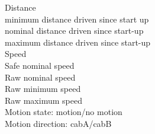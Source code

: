 \documentclass{template/openetcs_report}
\begin{document}
Distance\\
minimum distance driven since start up\\
nominal distance driven since start-up\\
maximum distance driven since start-up\\

Speed\\
Safe nominal speed\\
Raw nominal speed\\
Raw minimum speed\\
Raw maximum speed\\

Motion state: motion/no motion\\

Motion direction:  cabA/cabB\\


 
\appendix




\newpage
{}
\printindex

\end{document}
